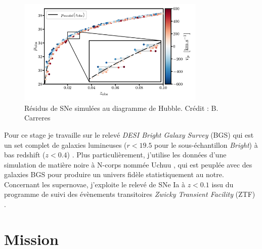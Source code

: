 \documentclass{article}
\begin{document}
\begin{figure}
    \centering
    \includegraphics[width=0.8\textwidth]{figures/Residues.png}
    \caption{Résidus de SNe simulées au diagramme de Hubble. Crédit : B. Carreres}
    \label{fig:residues}
\end{figure}

Pour ce stage je travaille sur le relevé \textit{DESI Bright Galaxy Survey} (BGS) qui est un set complet de galaxies lumineuses ($r < 19.5$ pour le sous-échantillon \textit{Bright}) à bas redshift ($z<0.4$) \cite{hahn_desi_2023}. Plus particulièrement, j'utilise les données d'une simulation de matière noire à N-corps nommée Uchuu \cite{prada_desi_2023}, qui est peuplée avec des galaxies BGS pour produire un univers fidèle statistiquement au notre. Concernant les supernovae, j'exploite le relevé de SNe Ia à $z<0.1$ issu du programme de suivi des évènements transitoires \textit{Zwicky Transient Facility} (ZTF) \cite{bellm_zwicky_2018}.

\section{Mission}

\end{document}
